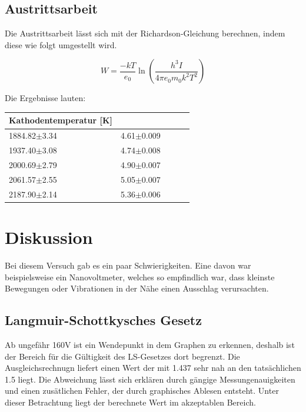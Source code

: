 \subsection{Austrittsarbeit}

Die Austrittsarbeit lässt sich mit der Richardson-Gleichung berechnen, indem diese wie folgt umgestellt wird.

\begin{displaymath}
    W = \frac{-kT}{e_0} \ln\left(\frac{h^3I}{4\pi e_0m_0k^2T^2}\right) 
\end{displaymath}

Die Ergebnisse lauten:

\begin{minipage}{\linewidth}
    \begin{table}[H]
        \centering
    
    \begin{tabular}{lllll}
        \toprule
        Kathodentemperatur [K] & \\
        \midrule
        1884.82$\pm$3.34 & 4.61$\pm$0.009 \\
        1937.40$\pm$3.08 & 4.74$\pm$0.008 \\
        2000.69$\pm$2.79 & 4.90$\pm$0.007 \\
        2061.57$\pm$2.55 & 5.05$\pm$0.007 \\
        2187.90$\pm$2.14 & 5.36$\pm$0.006 \\
        \bottomrule   
    \end{tabular}
    \label{tab:3}
\end{table}
\end{minipage}

\section{Diskussion}

Bei diesem Versuch gab es ein paar Schwierigkeiten. Eine davon war beispielsweise ein Nanovoltmeter, welches so empfindlich war, dass kleinste Bewegungen oder Vibrationen in der Nähe einen Ausschlag verursachten. 

\subsection{Langmuir-Schottkysches Gesetz}

\noindent Ab ungefähr 160V ist ein Wendepunkt in dem Graphen zu erkennen, deshalb ist der Bereich für die Gültigkeit des LS-Gesetzes dort begrenzt. Die Ausgleichsrechnugn liefert einen Wert der mit 1.437 sehr nah an den tatsächlichen 1.5 liegt. Die Abweichung lässt sich erklären durch gängige Messungenauigkeiten und einen zusätlichen Fehler, der durch graphisches Ablesen entsteht. Unter dieser Betrachtung liegt der berechnete Wert im akzeptablen Bereich.

